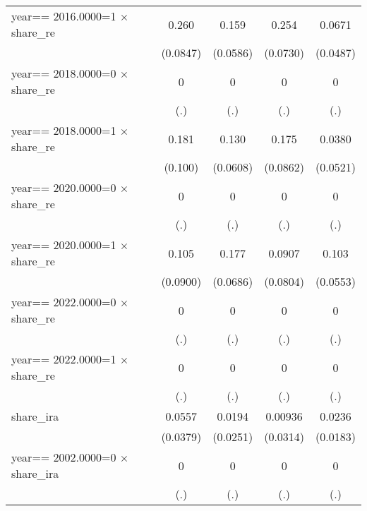 \begin{table}[htbp]
\begin{tabular}{l*{4}{c}}
year==  2016.0000=1 $\times$ share\_re&    0.260\sym{***}&    0.159\sym{***}&    0.254\sym{***}&   0.0671         \\
                & (0.0847)         & (0.0586)         & (0.0730)         & (0.0487)         \\
year==  2018.0000=0 $\times$ share\_re&        0         &        0         &        0         &        0         \\
                &      (.)         &      (.)         &      (.)         &      (.)         \\
year==  2018.0000=1 $\times$ share\_re&    0.181\sym{*}  &    0.130\sym{**} &    0.175\sym{**} &   0.0380         \\
                &  (0.100)         & (0.0608)         & (0.0862)         & (0.0521)         \\
year==  2020.0000=0 $\times$ share\_re&        0         &        0         &        0         &        0         \\
                &      (.)         &      (.)         &      (.)         &      (.)         \\
year==  2020.0000=1 $\times$ share\_re&    0.105         &    0.177\sym{***}&   0.0907         &    0.103\sym{*}  \\
                & (0.0900)         & (0.0686)         & (0.0804)         & (0.0553)         \\
year==  2022.0000=0 $\times$ share\_re&        0         &        0         &        0         &        0         \\
                &      (.)         &      (.)         &      (.)         &      (.)         \\
year==  2022.0000=1 $\times$ share\_re&        0         &        0         &        0         &        0         \\
                &      (.)         &      (.)         &      (.)         &      (.)         \\
share\_ira       &   0.0557         &   0.0194         &  0.00936         &   0.0236         \\
                & (0.0379)         & (0.0251)         & (0.0314)         & (0.0183)         \\
year==  2002.0000=0 $\times$ share\_ira&        0         &        0         &        0         &        0         \\
                &      (.)         &      (.)         &      (.)         &      (.)         \\

\end{tabular}
\end{table}
